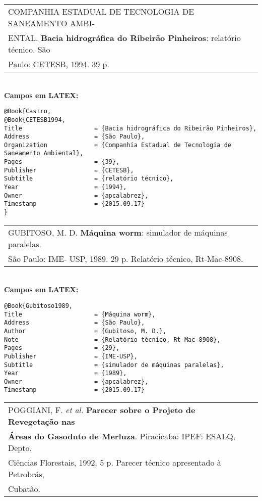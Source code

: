\begin{tabular}{|l|c|} \hline
	COMPANHIA ESTADUAL DE TECNOLOGIA DE SANEAMENTO AMBI-\\ENTAL. \textbf{Bacia hidrográfica do Ribeirão Pinheiros}: relatório técnico. São \\Paulo: CETESB, 1994. 39 p.   \\\hline
\end{tabular}\\

\textbf{Campos em LATEX:}

\begin{verbatim}
@Book{Castro,
@Book{CETESB1994,
Title                    = {Bacia hidrográfica do Ribeirão Pinheiros},
Address                  = {São Paulo},
Organization             = {Companhia Estadual de Tecnologia de 
Saneamento Ambiental},
Pages                    = {39},
Publisher                = {CETESB},
Subtitle                 = {relatório técnico},
Year                     = {1994},
Owner                    = {apcalabrez},
Timestamp                = {2015.09.17}
}
\end{verbatim}

\begin{tabular}{|l|c|} \hline
	GUBITOSO, M. D. \textbf{Máquina worm}: simulador de máquinas paralelas. \\São Paulo: IME- USP, 1989. 29 p. Relatório técnico, Rt-Mac-8908.   \\\hline
\end{tabular}\\

\textbf{Campos em LATEX:}

\begin{verbatim}
@Book{Gubitoso1989,
Title                    = {Máquina worm},
Address                  = {São Paulo},
Author                   = {Gubitoso, M. D.},
Note                     = {Relatório técnico, Rt-Mac-8908},
Pages                    = {29},
Publisher                = {IME-USP},
Subtitle                 = {simulador de máquinas paralelas},
Year                     = {1989},
Owner                    = {apcalabrez},
Timestamp                = {2015.09.17}
\end{verbatim}


\begin{tabular}{|l|c|} \hline
	POGGIANI, F. \textit{et al.} \textbf{ Parecer sobre o Projeto de Revegetação nas} \\ \textbf{Áreas do
		Gasoduto de Merluza}. Piracicaba: IPEF: ESALQ, Depto. \\ Ciências Florestais,
	1992. 5 p. Parecer técnico apresentado à Petrobrás,\\Cubatão.   \\\hline
\end{tabular}\\




